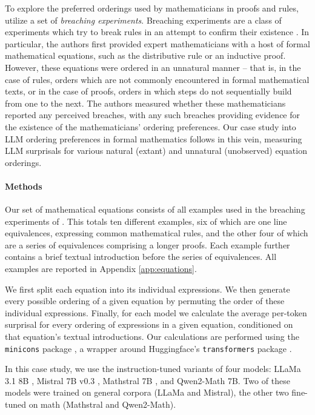 \documentclass{article}
\begin{document}
To explore the preferred orderings used by mathematicians in proofs and rules, \citet{mirin2022mathematicians} utilize a set of \textit{breaching experiments}. Breaching experiments are a class of experiments which try to break rules in an attempt to confirm their existence \citep{rafalovich2006making}. In particular, the authors first provided expert mathematicians with a host of formal mathematical equations, such as the distributive rule or an inductive proof. However, these equations were ordered in an unnatural manner -- that is, in the case of rules, orders which are not commonly encountered in formal mathematical texts, or in the case of proofs, orders in which steps do not sequentially build from one to the next. The authors measured whether these mathematicians reported any perceived breaches, with any such breaches providing evidence for the existence of the mathematicians' ordering preferences. Our case study into LLM ordering preferences in formal mathematics follows in this vein, measuring LLM surprisals for various natural (extant) and unnatural (unobserved) equation orderings.

\paragraph{Methods} Our set of mathematical equations consists of all examples used in the breaching experiments of \citet{mirin2022mathematicians}. This totals ten different examples, six of which are one line equivalences, expressing common mathematical rules, and the other four of which are a series of equivalences comprising a longer proofs. Each example further contains a brief textual introduction before the series of equivalences. All examples are reported in Appendix \ref{app:equations}.

 We first split each equation into its individual expressions. We then generate every possible ordering of a given equation by permuting the order of these individual expressions. Finally, for each model we calculate the average per-token surprisal for every ordering of expressions in a given equation, conditioned on that equation's textual introductions. Our calculations are performed using the \texttt{minicons} package \citep{misra2022minicons}, a wrapper around Huggingface's \texttt{transformers} package \citep{wolf-etal-2020-transformers}.

In this case study, we use the instruction-tuned variants of four models: LLaMa 3.1 8B \citep{dubey2024llama3herdmodels}, Mistral 7B v0.3 \citep{jiang2023mistral7b}, Mathstral 7B \citep{mathstral}, and Qwen2-Math 7B\citep{yang2024qwen2}. Two of these models were trained on general corpora (LLaMa and Mistral), the other two fine-tuned on math (Mathstral and Qwen2-Math).
\end{document}

